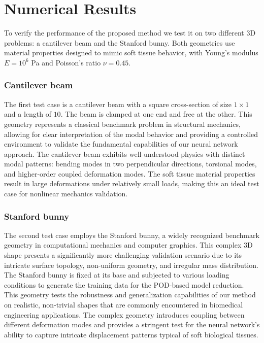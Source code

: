 \section{Numerical Results}
\label{sec:numerical_results}
To verify the performance of the proposed method we test it on two different 3D problems: a cantilever beam and the Stanford bunny. Both geometries use material properties designed to mimic soft tissue behavior, with Young's modulus $E = 10^6$ Pa and Poisson's ratio $\nu = 0.45$.

\subsubsection{Cantilever beam}
\label{sec:cantilever_beam_setup}
The first test case is a cantilever beam with a square cross-section of size $1 \times 1$ and a length of $10$. The beam is clamped at one end and free at the other. This geometry represents a classical benchmark problem in structural mechanics, allowing for clear interpretation of the modal behavior and providing a controlled environment to validate the fundamental capabilities of our neural network approach. The cantilever beam exhibits well-understood physics with distinct modal patterns: bending modes in two perpendicular directions, torsional modes, and higher-order coupled deformation modes. The soft tissue material properties result in large deformations under relatively small loads, making this an ideal test case for nonlinear mechanics validation.

\subsubsection{Stanford bunny}
\label{sec:stanford_bunny_setup}
The second test case employs the Stanford bunny, a widely recognized benchmark geometry in computational mechanics and computer graphics. This complex 3D shape presents a significantly more challenging validation scenario due to its intricate surface topology, non-uniform geometry, and irregular mass distribution. The Stanford bunny is fixed at its base and subjected to various loading conditions to generate the training data for the POD-based model reduction. This geometry tests the robustness and generalization capabilities of our method on realistic, non-trivial shapes that are commonly encountered in biomedical engineering applications. The complex geometry introduces coupling between different deformation modes and provides a stringent test for the neural network's ability to capture intricate displacement patterns typical of soft biological tissues.

